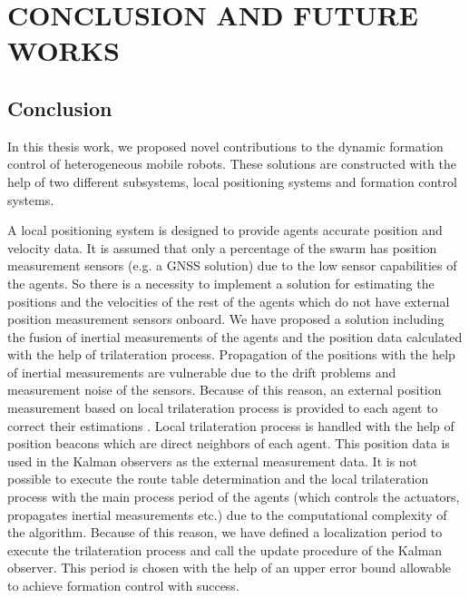 

\chapter{CONCLUSION AND FUTURE WORKS}
\label{chp:conclusion}








	
\section{Conclusion}
In this thesis work, we proposed novel contributions to the dynamic formation control of heterogeneous mobile robots. These solutions are constructed with the help of two different subsystems, local positioning systems and formation control systems. 

A	local positioning system is designed to provide agents accurate position and velocity data. It is assumed that only a percentage of the swarm has position measurement sensors (e.g. a GNSS solution) due to the low sensor capabilities of the agents. So there is a necessity to implement a solution for estimating the positions and the velocities of the rest of the agents which do not have external position measurement sensors onboard.  We have proposed a solution including the fusion of inertial measurements of the agents and the position data calculated with the help of trilateration process. Propagation of the positions with the help of inertial measurements are vulnerable due to the drift problems and measurement noise of the sensors. Because of this reason, an external position measurement based on local trilateration process is provided to each agent to correct their estimations . Local trilateration process is handled with the help of position beacons which are direct neighbors of each agent. This position data is used in the Kalman observers as the external measurement data. It is not possible to execute the route table determination and the local trilateration process with the main process period of the agents (which controls the actuators, propagates inertial measurements etc.) due to the computational complexity of the algorithm. Because of this reason, we have defined a localization period to execute the trilateration process and call the update procedure of the Kalman observer. This period is chosen with the help of an upper error bound allowable to achieve formation control with success.
       
